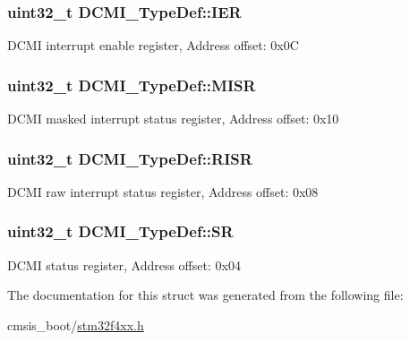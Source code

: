 \subsubsection[{\texorpdfstring{I\+ER}{IER}}]{ uint32\+\_\+t D\+C\+M\+I\+\_\+\+Type\+Def\+::\+I\+ER}\hypertarget{struct_d_c_m_i___type_def_a91ce93b57d8382147574c678ee497c63}{}\label{struct_d_c_m_i___type_def_a91ce93b57d8382147574c678ee497c63}
D\+C\+MI interrupt enable register, Address offset\+: 0x0C 
\subsubsection[{\texorpdfstring{M\+I\+SR}{MISR}}]{ uint32\+\_\+t D\+C\+M\+I\+\_\+\+Type\+Def\+::\+M\+I\+SR}\hypertarget{struct_d_c_m_i___type_def_ab367c4ca2e8ac87238692e6d55d622ec}{}\label{struct_d_c_m_i___type_def_ab367c4ca2e8ac87238692e6d55d622ec}
D\+C\+MI masked interrupt status register, Address offset\+: 0x10 
\subsubsection[{\texorpdfstring{R\+I\+SR}{RISR}}]{ uint32\+\_\+t D\+C\+M\+I\+\_\+\+Type\+Def\+::\+R\+I\+SR}\hypertarget{struct_d_c_m_i___type_def_ae0aba9f38498cccbe0186b7813825026}{}\label{struct_d_c_m_i___type_def_ae0aba9f38498cccbe0186b7813825026}
D\+C\+MI raw interrupt status register, Address offset\+: 0x08 
\subsubsection[{\texorpdfstring{SR}{SR}}]{ uint32\+\_\+t D\+C\+M\+I\+\_\+\+Type\+Def\+::\+SR}\hypertarget{struct_d_c_m_i___type_def_a1bbe4b3cc5d9552526bec462b42164d5}{}\label{struct_d_c_m_i___type_def_a1bbe4b3cc5d9552526bec462b42164d5}
D\+C\+MI status register, Address offset\+: 0x04 

The documentation for this struct was generated from the following file\+:\begin{DoxyCompactItemize}
\item 
cmsis\+\_\+boot/\hyperlink{stm32f4xx_8h}{stm32f4xx.\+h}\end{DoxyCompactItemize}
